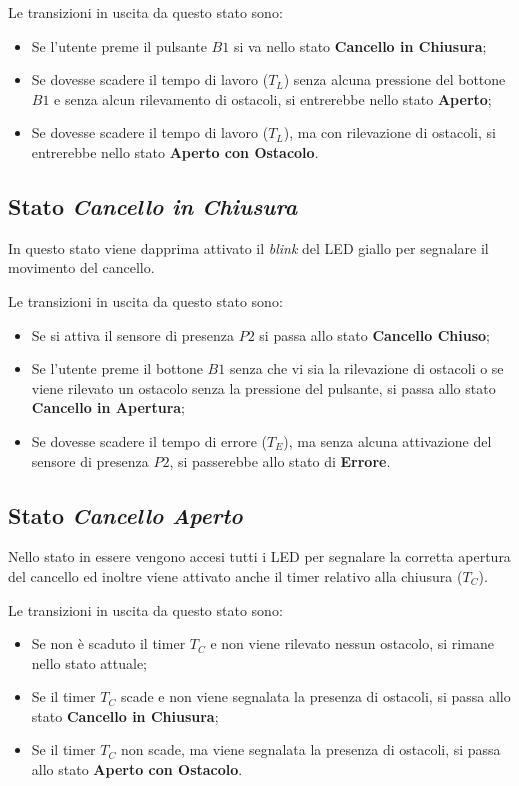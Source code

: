 \noindent Le transizioni in uscita da questo stato sono:
\begin{itemize}
    \item Se l'utente preme il pulsante $B1$ si va nello stato \textbf{Cancello in Chiusura};
    \item Se dovesse scadere il tempo di lavoro ($T_L$) senza alcuna pressione del bottone $B1$ e senza alcun rilevamento di ostacoli, si entrerebbe nello stato \textbf{Aperto};
    \item Se dovesse scadere il tempo di lavoro ($T_L$), ma con rilevazione di ostacoli, si entrerebbe nello stato \textbf{Aperto con Ostacolo}.
\end{itemize}


\subsection{Stato \textit{Cancello in Chiusura}}
In questo stato viene dapprima attivato il \textit{blink} del LED giallo per segnalare il movimento del cancello.

\noindent Le transizioni in uscita da questo stato sono:
\begin{itemize}
    \item Se si attiva il sensore di presenza $P2$ si passa allo stato \textbf{Cancello Chiuso};
    \item Se l'utente preme il bottone $B1$ senza che vi sia la rilevazione di ostacoli o se viene rilevato un ostacolo senza la pressione del pulsante, si passa allo stato \textbf{Cancello in Apertura};
    \item Se dovesse scadere il tempo di errore ($T_E$), ma senza alcuna attivazione del sensore di presenza $P2$, si passerebbe allo stato di \textbf{Errore}.
\end{itemize}


\subsection{Stato \textit{Cancello Aperto}}
Nello stato in essere vengono accesi tutti i LED per segnalare la corretta apertura del cancello ed inoltre viene attivato anche il timer relativo alla chiusura ($T_C$).

\noindent Le transizioni in uscita da questo stato sono:
\begin{itemize}
    \item Se non è scaduto il timer $T_C$ e non viene rilevato nessun ostacolo, si rimane nello stato attuale;
    \item Se il timer $T_C$ scade e non viene segnalata la presenza di ostacoli, si passa allo stato \textbf{Cancello in Chiusura};
    \item Se il timer $T_C$ non scade, ma viene segnalata la presenza di ostacoli, si passa allo stato \textbf{Aperto con Ostacolo}.
\end{itemize}



